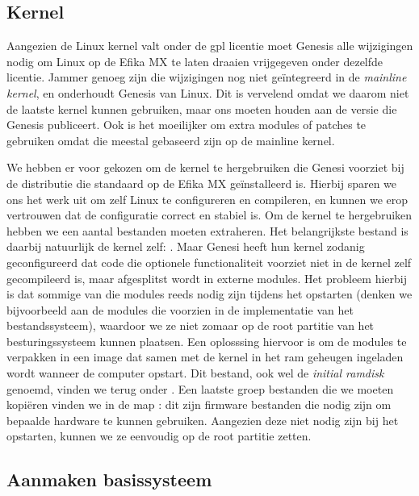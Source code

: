 \subsection{Kernel}
\label{kiosk:deployment:besturingssysteem:kernel}

Aangezien de Linux kernel valt onder de \ac{gpl} licentie moet Genesis alle wijzigingen nodig om Linux op de Efika MX te laten draaien vrijgegeven onder dezelfde licentie. Jammer genoeg zijn die wijzigingen nog niet geïntegreerd in de \emph{mainline kernel}, en onderhoudt Genesis  van Linux. Dit is vervelend omdat we daarom niet de laatste kernel kunnen gebruiken, maar ons moeten houden aan de versie die Genesis publiceert. Ook is het moeilijker om extra modules of patches te gebruiken omdat die meestal gebaseerd zijn op de mainline kernel.

We hebben er voor gekozen om de kernel te hergebruiken die Genesi voorziet bij de distributie die standaard op de Efika MX geïnstalleerd is. Hierbij sparen we ons het werk uit om zelf Linux te configureren en compileren, en kunnen we erop vertrouwen dat de configuratie correct en stabiel is. Om de kernel te hergebruiken hebben we een aantal bestanden moeten extraheren. Het belangrijkste bestand is daarbij natuurlijk de kernel zelf: . Maar Genesi heeft hun kernel zodanig geconfigureerd dat code die optionele functionaliteit voorziet niet in de kernel zelf gecompileerd is, maar afgesplitst wordt in externe modules. Het probleem hierbij is dat sommige van die modules reeds nodig zijn tijdens het opstarten (denken we bijvoorbeeld aan de modules die voorzien in de implementatie van het bestandssysteem), waardoor we ze niet zomaar op de root partitie van het besturingssysteem kunnen plaatsen. Een oplosssing hiervoor is om de modules te verpakken in een image dat samen met de kernel in het \ac{ram} geheugen ingeladen wordt wanneer de computer opstart. Dit bestand, ook wel de \emph{initial ramdisk} genoemd, vinden we terug onder . Een laatste groep bestanden die we moeten kopiëren vinden we in de map : dit zijn firmware bestanden die nodig zijn om bepaalde hardware te kunnen gebruiken. Aangezien deze niet nodig zijn bij het opstarten, kunnen we ze eenvoudig op de root partitie zetten.

\subsection{Aanmaken basissysteem}
\label{kiosk:deployment:besturingssysteem:basissysteem}

